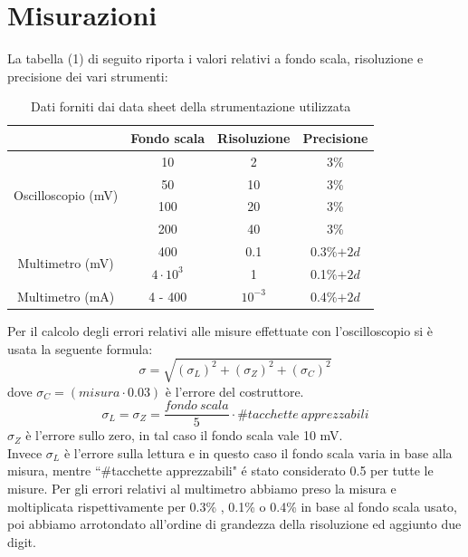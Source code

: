 \documentclass[]{article}
\begin{document}
\section{Misurazioni}
La tabella (1) di seguito riporta i valori relativi a fondo scala, risoluzione e precisione dei vari strumenti:
	\begin{table}[H]
		\centering
		\begin{tabular}{|c|c|c|c|}
			\cline{2-4}
			\multicolumn{1}{c|}{} & Fondo scala & Risoluzione & Precisione \\
			\hline
			\multirow{4}{*}{Oscilloscopio (mV)} & 10 & 2 & 3\% \\
			\cline{2-4}
			& 50 & 10 & 3\% \\
			\cline{2-4}
			& 100 & 20 & 3\% \\
			\cline{2-4}
			& 200 & 40 & 3\% \\
			\hline
			\multirow{2}{*}{Multimetro (mV)} & 400 & 0.1 & 0.3\%$+2d$ \\
			\cline{2-4}
			&$4\cdot10^3$ & 1 & 0.1\%$+2d$\\
			\hline
			Multimetro (mA) & 4 - 400 & $10^{-3}$ & 0.4\%$+2d$ \\
			\hline
		\end{tabular}
	\label{tab:strumenti}
	\caption{Dati forniti dai data sheet della strumentazione utilizzata}
	\end{table}
Per il calcolo degli errori relativi alle misure effettuate con l'oscilloscopio si è usata la seguente formula:
\begin{equation}
	\sigma=\sqrt{(\sigma_{L})^{2}+(\sigma_{Z})^{2}+(\sigma_{C})^{2}}
\end{equation}
dove $\sigma_{C}= (misura\cdot0.03) $ è l'errore del costruttore. 
\begin{equation*}
	\sigma_{L}=\sigma_{Z}=\frac{fondo \:scala}{5}\cdot\#tacchette \:apprezzabili
\end{equation*}
$ \sigma_{Z} $ è l'errore sullo zero, in tal caso il fondo scala vale 10 mV.\\
Invece $ \sigma_{L} $ è l'errore sulla lettura e in questo caso il fondo scala varia in base alla misura, mentre ``\#tacchette apprezzabili" é stato considerato 0.5 per tutte le misure.
Per gli errori relativi al multimetro abbiamo preso la misura e moltiplicata rispettivamente per 0.3\% , 0.1\% o 0.4\%  in base al fondo scala usato, poi abbiamo arrotondato all'ordine di grandezza della risoluzione ed aggiunto due digit.
\end{document}
